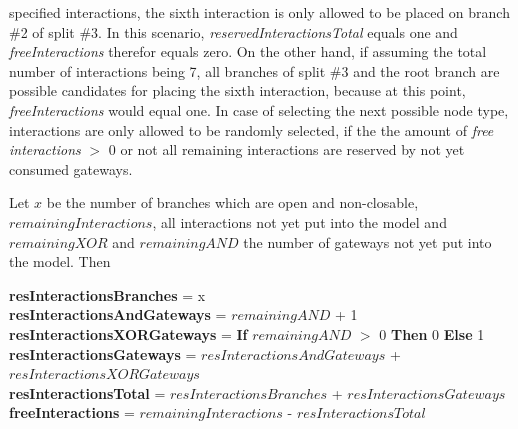 specified interactions, the sixth interaction is only allowed to be placed on branch \#2 of split \#3. In this scenario, \textit{reservedInteractionsTotal} equals one and \textit{freeInteractions} therefor equals zero. On the other hand, if assuming the total number of interactions being 7, all branches of split \#3 and the root branch are possible candidates for placing the sixth interaction, because at this point, \textit{freeInteractions} would equal one. In case of selecting the next possible node type, interactions are only allowed to be randomly selected, if the the amount of \textit{free interactions} $>$ 0 or not all remaining interactions are reserved by not yet consumed gateways.

\begin{Def}
	Let $x$ be the number of branches which are open and non-closable, \\$remainingInteractions$, all interactions not yet put into the model and \\$remainingXOR$ and $remainingAND$ the number of gateways not yet put into the model. Then
	\begin{center}
		\textbf{resInteractionsBranches} = x\\
		\textbf{resInteractionsAndGateways} = $remainingAND$ + 1\\
		\textbf{resInteractionsXORGateways} = \textbf{If} $remainingAND$ \textbf{$>$} 0 \textbf{Then} 0 \textbf{Else} 1\\
		\textbf{resInteractionsGateways} = $resInteractionsAndGateways$ + $resInteractionsXORGateways$\\
		\textbf{resInteractionsTotal} = $resInteractionsBranches$ + $resInteractionsGateways$\\
		\textbf{freeInteractions} = $remainingInteractions$ - $resInteractionsTotal$
	\end{center}
	\label{def:def1}
\end{Def}


